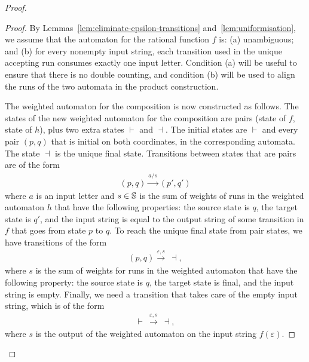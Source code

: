 \begin{proof}
\begin{proof}
        By Lemmas~\ref{lem:eliminate-epsilon-transitions} and~\ref{lem:uniformisation}, we assume that the automaton for the rational function $f$ is: (a) unambiguous; and (b) for every nonempty input string, each transition used in the unique accepting run consumes exactly one input letter. Condition (a) will be useful to ensure that there is no double counting, and condition (b) will be used to align the runs of the two automata in the product construction.

        The weighted automaton for the composition is now constructed as follows.  
        The states of the new weighted automaton for the composition are pairs (state of $f$, state of $h$), plus two extra states $\vdash$ and  $\dashv$. The initial states are $\vdash$ and every pair $(p,q)$ that  is initial on both coordinates, in the corresponding automata. The state $\dashv$ is the unique final state. Transitions between states that are pairs are of the form
        \begin{align*}
        (p,q) \xrightarrow {a/s} (p',q')
        \end{align*}
        where $a$ is an input letter and $s \in \mathbb S$ is the sum of weights of runs in the weighted automaton $h$ that have the following properties: the source state is $q$, the target state is $q'$, and the input string is equal to the output string of some transition in $f$ that goes from state $p$ to $q$. To reach the unique final state from pair states, we have transitions of the form
        \begin{align*}
        (p,q) \xrightarrow {\varepsilon, s} \ \dashv,
        \end{align*}
        where $s$ is the sum of weights for runs in the weighted automaton that have the following property: the source state is $q$, the target state is final, and the input string is empty. Finally, we need a transition that takes care of the empty input string, which is of the form
        \begin{align*}
        \vdash\  \xrightarrow {\varepsilon, s}\  \dashv,
        \end{align*}
        where $s$ is the output of the weighted automaton on the input string $f(\varepsilon)$.
    \end{proof}
\end{proof}


